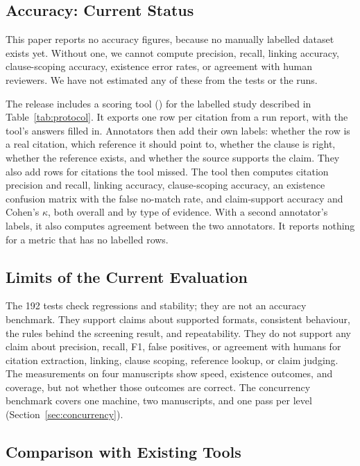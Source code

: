 \documentclass{article}
\newcommand{\vd}[1]{\texttt{\detokenize{#1}}}
\begin{document}
\subsection{Accuracy: Current Status}
\label{sec:accuracy}

This paper reports no accuracy figures, because no manually labelled dataset exists yet. Without one, we cannot compute precision, recall, linking accuracy, clause-scoping accuracy, existence error rates, or agreement with human reviewers. We have not estimated any of these from the tests or the runs.

The release includes a scoring tool (\vd{tools/evaluate.py}) for the labelled study described in Table~\ref{tab:protocol}. It exports one row per citation from a run report, with the tool's answers filled in. Annotators then add their own labels: whether the row is a real citation, which reference it should point to, whether the clause is right, whether the reference exists, and whether the source supports the claim. They also add rows for citations the tool missed. The tool then computes citation precision and recall, linking accuracy, clause-scoping accuracy, an existence confusion matrix with the false no-match rate, and claim-support accuracy and Cohen's $\kappa$, both overall and by type of evidence. With a second annotator's labels, it also computes agreement between the two annotators. It reports nothing for a metric that has no labelled rows.

\subsection{Limits of the Current Evaluation}

The 192 tests check regressions and stability; they are not an accuracy benchmark. They support claims about supported formats, consistent behaviour, the rules behind the screening result, and repeatability. They do not support any claim about precision, recall, F1, false positives, or agreement with humans for citation extraction, linking, clause scoping, reference lookup, or claim judging. The measurements on four manuscripts show speed, existence outcomes, and coverage, but not whether those outcomes are correct. The concurrency benchmark covers one machine, two manuscripts, and one pass per level (Section~\ref{sec:concurrency}).

\subsection{Comparison with Existing Tools}
\end{document}
